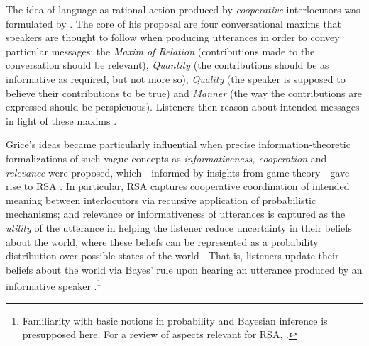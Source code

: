 The idea of language as rational action produced by \emph{cooperative} interlocutors was formulated by \textcite{grice1975logic}. The core of his proposal are four conversational maxims that speakers are thought to follow when producing utterances in order to convey particular messages: the \emph{Maxim of Relation} (contributions made to the conversation should be relevant), \emph{Quantity} (the contributions should be as informative as required, but not more so), \emph{Quality} (the speaker is supposed to believe their contributions to be true) and \emph{Manner} (the way the contributions are expressed should be perspicuous). Listeners then reason about intended messages in light of these maxims \parencite{grice1975logic}.

Grice’s ideas became particularly influential when precise information-theoretic formalizations of such vague concepts as \emph{informativeness, cooperation} and \emph{relevance} were proposed, which---informed by insights from game-theory---gave rise to RSA \parencite{frank2012predicting}.
In particular, RSA captures cooperative coordination of intended meaning between interlocutors via recursive application of probabilistic mechanisms; and relevance or informativeness of utterances is captured as the \emph{utility} of the utterance in helping the listener reduce uncertainty in their beliefs about the world, where these beliefs can be represented as a probability distribution over possible states of the world \parencite[as advocated by e.g.][]{tenenbaum2011grow}.  
That is, listeners update their beliefs about the world via Bayes' rule upon hearing an utterance produced by an informative speaker \parencite{frank2012predicting}.\footnote{Familiarity with basic notions in probability and Bayesian inference is presupposed here. For a review of aspects relevant for RSA, \textcite[see e.g.][]{lassiter2017adjectival}.}

